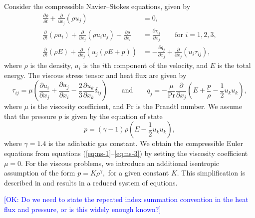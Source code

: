 \documentclass[review]{siamart}
\newcommand{\OK}[1]{\textcolor{blue}{[OK: #1]}}
\begin{document}
Consider the compressible Navier--Stokes equations, given by
\begin{align}
    \label{eq:ns-1}
	 \frac{\partial\rho}{\partial t} + \frac{\partial}{\partial x_j}(\rho u_j)
	 	&= 0, \\
    \label{eq:ns-2}
    \frac{\partial}{\partial t}(\rho u_i) + \frac{\partial}{\partial x_j} (\rho u_i u_j) + \frac{\partial p}{\partial x_i}
      &= \frac{\partial \tau_{ij}}{\partial x_j} \qquad \text{for $i=1,2,3,$}\\
    \label{eq:ns-3}
	 \frac{\partial}{\partial t}(\rho E) + \frac{\partial}{\partial x_j} \left(u_j(\rho E + p) \right)
	 	&= -\frac{\partial q_j}{\partial x_j} + \frac{\partial}{\partial x_j} (u_i \tau_{ij}),
\end{align}
where $\rho$ is the density, $u_i$ is the $i$th component of the velocity, and $E$ is the total energy.
The viscous stress tensor and heat flux are given by
\begin{equation}
	\tau_{ij} = \mu\left(
		\frac{\partial u_i}{\partial x_j} + \frac{\partial u_j}{\partial x_i}
		- \frac{2}{3} \frac{\partial u_k}{\partial x_k}  \delta_{ij}
	\right)
	\qquad\text{and}\qquad
	q_j = - \frac{\mu}{\mathrm{Pr}} \frac{\partial}{\partial x_j} \left(E + \frac{p}{\rho} - \frac{1}{2} u_k u_k \right),
\end{equation}
where $\mu$ is the viscosity coefficient, and $\mathrm{Pr}$ is the Prandtl number.
We assume that the pressure $p$ is given by the equation of state
\begin{equation} \label{eq:eos}
    p = (\gamma - 1)\rho \left( E - \frac{1}{2} u_k u_k \right),
\end{equation}
where $\gamma = 1.4$ is the adiabatic gas constant.
We obtain the compressible Euler equations from equations (\ref{eq:ns-1}--\ref{eq:ns-3}) by setting the viscosity coefficient $\mu = 0$.
For the viscous problems, we introduce an additional isentropic assumption of the form $p = K \rho^\gamma,$ for a given constant $K$.
This simplification is described in \cite{Kanner2015} and results in a reduced system of equtions.

\OK{Do we need to state the repeated index summation convention in the heat flux and pressure, or is this widely enough known?}
\end{document}
